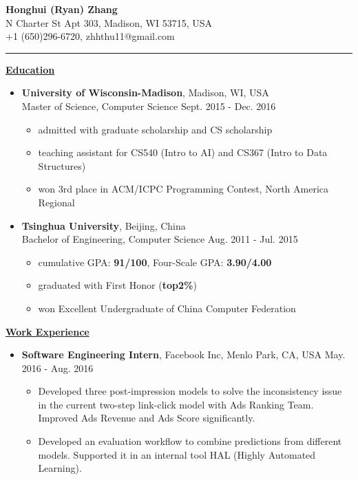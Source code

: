 \documentclass[11pt]{article}
\begin{document}
\begin{CJK}{GBK}{kai}
\begin{center}
  {\textbf{\huge Honghui (Ryan) Zhang}}\\ N Charter St Apt 303, Madison, WI 53715, USA\\
  +1 (650)296-6720, zhhthu11@gmail.com\\
\end{center}
\rule[4pt]{18.5cm}{0.5pt}
{ \textbf{\underline{Education}}}\\\medskip
\begin{itemize}
  \item \textbf{University of Wisconsin-Madison}, Madison, WI, USA\\
  Master of Science, Computer Science  \hfill Sept. 2015 - Dec. 2016\\
    \begin{itemize}
    \item admitted with graduate scholarship and CS scholarship
    \item teaching assistant for CS540 (Intro to AI) and CS367 (Intro to Data Structures)
    \item won 3rd place in ACM/ICPC Programming Contest, North America Regional\\\medskip
    \end{itemize}
 \item \textbf{Tsinghua University}, Beijing, China\\
 Bachelor of Engineering, Computer Science \hfill Aug. 2011 - Jul. 2015\\
    \begin{itemize}
    \item cumulative GPA: \textbf{91/100}, Four-Scale GPA: \textbf{3.90/4.00}
    \item graduated with First Honor (\textbf{top2\%})
    \item won Excellent Undergraduate of China Computer Federation
    \end{itemize}
\end{itemize}

\bigskip

{\textbf{\underline{Work Experience}}}\\\medskip

\begin{itemize}
   \item \textbf{Software Engineering Intern}, Facebook Inc, Menlo Park, CA, USA \hfill May. 2016 - Aug. 2016\\
     \begin{itemize}
     \item Developed three post-impression models to solve the inconsistency issue in the current two-step link-click model with Ads Ranking Team. Improved Ads Revenue and Ads Score significantly. 
     \item Developed an evaluation workflow to combine predictions from different models. Supported it in an internal tool HAL (Highly Automated Learning).\\\medskip
     \end{itemize}


\end{itemize}
\end{CJK}
\end{document}
